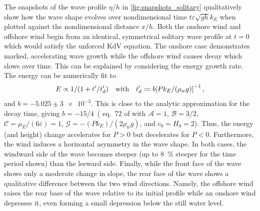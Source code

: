 \documentclass{jfm}
\renewcommand*{\epsilon}{\varepsilon}
\begin{document}
The snapshots of the wave profile $\eta/h$ in
\cref{fig:snapshots_solitary} qualitatively show how the wave shape
evolves over nondimensional time $t \epsilon \sqrt{g h} k_E$ when
plotted against the nondimensional distance $x/h$.
Both the onshore wind  and offshore
wind  begin from an identical,
symmetrical solitary wave profile at $t=0$ which would satisfy the
unforced KdV equation.
The onshore case  demonstrates
marked, accelerating wave growth while the offshore wind
 causes decay which slows over time.
This can be explained by considering the energy growth rate.
The energy can be numerically fit to
\begin{equation}
  E \propto 1/\pqty{1 + t'/t_d'}
  \qq{with}
  t_d' \coloneqq b \bqty{P k_E/(\rho_w g)}^{-1}
  \,,
  \label{eq:actual_energy}
\end{equation}
and $b = -5.025 \pm \num{3e-3}$.
This is close to the analytic approximation for the decay time, giving
$b = -15/4$~(\eg{} eq.\ 72 of \citealp{zdyrski2019effects} with
$\mathcal{A}=1$, $\mathcal{B} = 3/2$, $\mathcal{C} = \mu_E/(6\epsilon) =
1$, $\mathcal{G} = -(P k_E)/(2 \rho_w g)$, and $c_0 = H_0 = 2$).
Thus, the energy (and height) change accelerates for $P>0$ but
decelerates for $P<0$.
Furthermore, the wind induces a horizontal asymmetry in the wave shape.
In both cases, the windward side of the wave becomes steeper (up to
\SI{8}{\percent} steeper for the time period shown) than the leeward
side.
Finally, while the front face of the wave shows only a moderate change in
slope, the rear face of the wave shows a qualitative difference between
the two wind directions.
Namely, the offshore wind raises the rear base of the wave relative to
its initial profile while an onshore wind depresses it, even forming a
small depression below the still water level.
\end{document}
